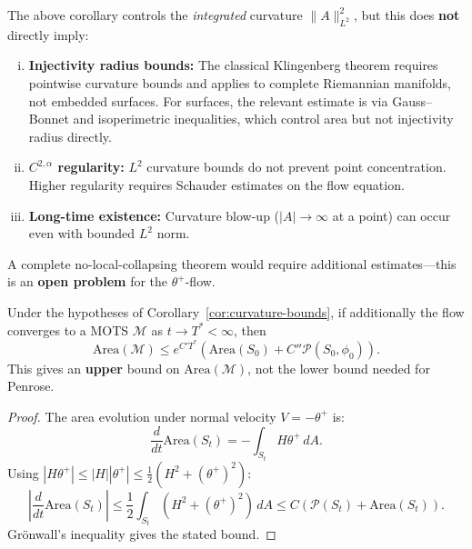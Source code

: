 \begin{remark}
\label{rem:no-collapse-gap}
The above corollary controls the \emph{integrated} curvature $\|A\|_{L^2}^2$, but this does \textbf{not} directly imply:
\begin{enumerate}[(i)]
\item \textbf{Injectivity radius bounds:} The classical Klingenberg theorem requires pointwise curvature bounds and applies to complete Riemannian manifolds, not embedded surfaces. For surfaces, the relevant estimate is via Gauss--Bonnet and isoperimetric inequalities, which control area but not injectivity radius directly.
\item \textbf{$C^{2,\alpha}$ regularity:} $L^2$ curvature bounds do not prevent point concentration. Higher regularity requires Schauder estimates on the flow equation.
\item \textbf{Long-time existence:} Curvature blow-up ($|A| \to \infty$ at a point) can occur even with bounded $L^2$ norm.
\end{enumerate}
A complete no-local-collapsing theorem would require additional estimates---this is an \textbf{open problem} for the $\theta^+$-flow.
\end{remark}

\begin{corollary}
\label{cor:weak-area}
Under the hypotheses of Corollary~\ref{cor:curvature-bounds}, if additionally the flow converges to a MOTS $\mathcal{M}$ as $t \to T^* < \infty$, then
\begin{equation}
\mathrm{Area}(\mathcal{M}) \leq e^{C'T^*}\left(\mathrm{Area}(S_0) + C''\mathcal{P}(S_0, \phi_0)\right).
\end{equation}
This gives an \textbf{upper} bound on $\mathrm{Area}(\mathcal{M})$, not the lower bound needed for Penrose.
\end{corollary}

\begin{proof}
The area evolution under normal velocity $V = -\theta^+$ is:
\begin{equation}
\frac{d}{dt}\mathrm{Area}(S_t) = -\int_{S_t} H\theta^+ \, dA.
\end{equation}
Using $|H\theta^+| \leq |H||\theta^+| \leq \frac{1}{2}(H^2 + (\theta^+)^2)$:
\begin{equation}
\left|\frac{d}{dt}\mathrm{Area}(S_t)\right| \leq \frac{1}{2}\int_{S_t} (H^2 + (\theta^+)^2) \, dA \leq C(\mathcal{P}(S_t) + \mathrm{Area}(S_t)).
\end{equation}
Gr\"onwall's inequality gives the stated bound.
\end{proof}

